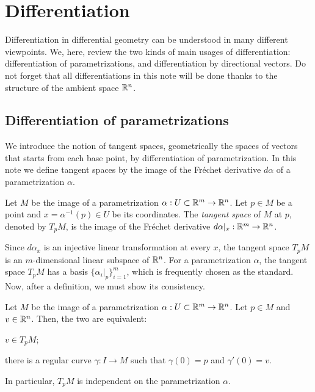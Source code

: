 \documentclass{../../large}
\def\a{\alpha}
\begin{document}
\section{Differentiation}
Differentiation in differential geometry can be understood in many different viewpoints.
We, here, review the two kinds of main usages of differentiation: differentiation of parametrizations, and differentiation by directional vectors.
Do not forget that all differentiations in this note will be done thanks to the structure of the ambient space $\mathbb{R}^n$.

\subsection{Differentiation of parametrizations}
We introduce the notion of tangent spaces, geometrically the spaces of vectors that starts from each base point, by differentiation of parametrization.
In this note we define tangent spaces by the image of the Fr\'echet derivative $d\a$ of a parametrization $\a$.

\begin{defn}
Let $M$ be the image of a parametrization $\a:U\subset\R^m\to\R^n$.
Let $p\in M$ be a point and $x=\a^{-1}(p)\in U$ be its coordinates.
The \emph{tangent space} of $M$ at $p$, denoted by $T_pM$, is the image of the Fr\'echet derivative $d\a|_x:\R^m\to\R^n$.
\end{defn}

Since $d\a_x$ is an injective linear transformation at every $x$, the tangent space $T_pM$ is an $m$-dimensional linear subspace of $\mathbb{R}^n$.
For a parametrization $\a$, the tangent space $T_pM$ has a basis $\{\a_i|_p\}_{i=1}^m$, which is frequently chosen as the standard.
Now, after a definition, we must show its consistency.

\begin{prop}
Let $M$ be the image of a parametrization $\a:U\subset\R^m\to\R^n$.
Let $p\in M$ and $v\in\mathbb{R}^n$.
Then, the two are equivalent:
\begin{parts}
\item $v\in T_pM$;
\item there is a regular curve $\gamma:I\to M$ such that $\gamma(0)=p$ and $\gamma'(0)=v.$
\end{parts}
In particular, $T_pM$ is independent on the parametrization $\a$.
\end{prop}
\begin{pf}
\end{pf}
\end{document}
